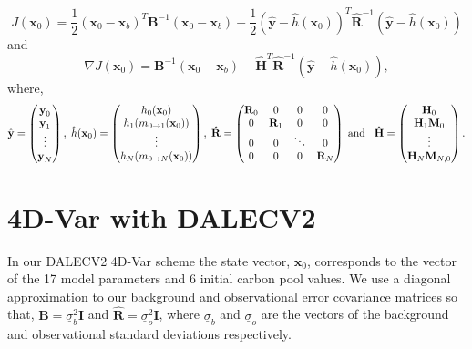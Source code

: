 \documentclass[11pt]{article}
\begin{document}
\begin{equation}
J(\textbf{x}_0) = \frac{1}{2}(\textbf{x}_0-\textbf{x}_b)^{T}\textbf{B}^{-1}(\textbf{x}_0-\textbf{x}_b)+\frac{1}{2}(\hat{\textbf{y}}-\hat{h}(\textbf{x}_0))^{T}\hat{\textbf{R}}^{-1}(\hat{\textbf{y}}-\hat{h}(\textbf{x}_0)) \label{costfn}
\end{equation}
and
\begin{equation}
\nabla J(\textbf{x}_0) = \textbf{B}^{-1}(\textbf{x}_0-\textbf{x}_b)-\hat{\mathbf{H}}^{T}\hat{\textbf{R}}^{-1}(\hat{\textbf{y}}-\hat{h}(\textbf{x}_0)), \label{gradcostfn}
\end{equation}
where,
\begin{equation}
\hat{\textbf{y}}=
\begin{pmatrix}
\textbf{y}_0 \\
\textbf{y}_1\\
\vdots \\
\textbf{y}_N
\end{pmatrix},
\hspace{1mm}
\hat{h}(\textbf{x}_0)=
\begin{pmatrix}
h_0(\textbf{x}_0) \\
h_1(m_{0\rightarrow 1}(\mathbf{x}_{0}))\\
\vdots \\
h_N(m_{0\rightarrow N}(\mathbf{x}_{0}))
\end{pmatrix},
\hspace{1mm}
\hat{\mathbf{R}}=
\begin{pmatrix}
\mathbf{R}_0 & 0 & 0 & 0 \\
0 & \mathbf{R}_1 & 0 & 0 \\
0 & 0 & \ddots & 0 \\
0 & 0 & 0 & \mathbf{R}_N
\end{pmatrix}
\hspace{1mm} \text{and} \hspace{3mm}
\hat{\mathbf{H}}=
\begin{pmatrix}
\mathbf{H}_0 \\
\mathbf{H}_1\mathbf{M}_0\\
\vdots \\
\mathbf{H}_N\mathbf{M}_{N,0}
\end{pmatrix}.
\end{equation}

\section{4D-Var with DALECV2}

In our DALECV2 4D-Var scheme the state vector, $\textbf{x}_0$, corresponds to the vector of the 17 model parameters and 6 initial carbon pool values. We use a diagonal approximation to our background and observational error covariance matrices so that, 
$\textbf{B}=\underline{\sigma}_b^2 \textbf{I}$ and $\hat{\textbf{R}}=\underline{\sigma}_o^2 \textbf{I}$,
where $\underline{\sigma}_b$ and $\underline{\sigma}_o$ are the vectors of the background and observational standard deviations respectively.
\end{document}
